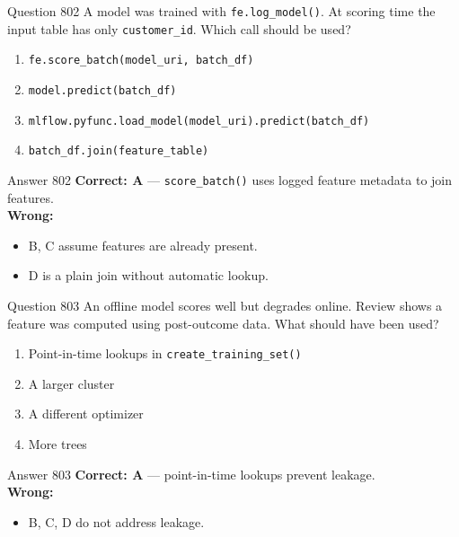 \documentclass[aspectratio=169,11pt]{beamer}
\begin{document}
	\begin{frame}{Question 802}
		A model was trained with \texttt{fe.log\_model()}. At scoring time the input table has only \texttt{customer\_id}. Which call should be used?
		\begin{enumerate}[label=\Alph*.]
			\item \texttt{fe.score\_batch(model\_uri, batch\_df)}
			\item \texttt{model.predict(batch\_df)}
			\item \texttt{mlflow.pyfunc.load\_model(model\_uri).predict(batch\_df)}
			\item \texttt{batch\_df.join(feature\_table)}
		\end{enumerate}
	\end{frame}
	\begin{frame}{Answer 802}
		\textbf{Correct: A} --- \texttt{score\_batch()} uses logged feature metadata to join features.\\
		\vspace{0.5em}
		\textbf{Wrong:}
		\begin{itemize}
			\item B, C assume features are already present.
			\item D is a plain join without automatic lookup.
		\end{itemize}
	\end{frame}
	
	\begin{frame}{Question 803}
		An offline model scores well but degrades online. Review shows a feature was computed using post-outcome data. What should have been used?
		\begin{enumerate}[label=\Alph*.]
			\item Point-in-time lookups in \texttt{create\_training\_set()}
			\item A larger cluster
			\item A different optimizer
			\item More trees
		\end{enumerate}
	\end{frame}
	\begin{frame}{Answer 803}
		\textbf{Correct: A} --- point-in-time lookups prevent leakage.\\
		\vspace{0.5em}
		\textbf{Wrong:}
		\begin{itemize}
			\item B, C, D do not address leakage.
		\end{itemize}
	\end{frame}
	
\end{document}
